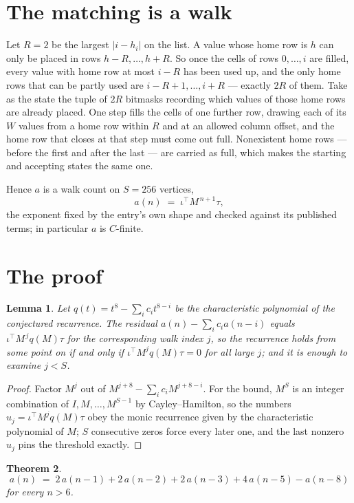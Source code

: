 \documentclass[11pt,a4paper]{article}
\theoremstyle{plain}
\newtheorem{theorem}{Theorem}
\newtheorem{lemma}[theorem]{Lemma}
\theoremstyle{definition}
\begin{document}
\section{The matching is a walk}

Let $R=2$ be the largest $|i-h_i|$ on the list. A value whose home row is $h$ can only be
placed in rows $h-R,\dots,h+R$. So once the cells of rows $0,\dots,i$ are filled, every
value with home row at most $i-R$ has been used up, and the only home rows that can be
partly used are $i-R+1,\dots,i+R$ --- exactly $2R$ of them. Take as the state the tuple of
$2R$ bitmasks recording which values of those home rows are already placed. One step fills
the cells of one further row, drawing each of its $W$ values from a home row within $R$
and at an allowed column offset, and the home row that closes at that step must come out
full. Nonexistent home rows --- before the first and after the last --- are carried as
full, which makes the starting and accepting states the same one.

Hence $a$ is a walk count on $S=256$ vertices,
\[
a(n)\;=\;\iota^{\!\top}M^{\,n+1}\tau ,
\]
the exponent fixed by the entry's own shape and checked against its published terms; in
particular $a$ is $C$-finite.

\section{The proof}

\begin{lemma}\label{lem:crit}
Let $q(t)=t^{8}-\sum_i c_it^{8-i}$ be the characteristic polynomial of the
conjectured recurrence. The residual $a(n)-\sum_ic_ia(n-i)$ equals
$\iota^{\!\top}M^{\,j}q(M)\tau$ for the corresponding walk index $j$, so the recurrence
holds from some point on if and only if $\iota^{\!\top}M^{j}q(M)\tau=0$ for all large $j$;
and it is enough to examine $j<S$.
\end{lemma}

\begin{proof}
Factor $M^{j}$ out of $M^{j+8}-\sum_ic_iM^{j+8-i}$. For the bound, $M^{S}$
is an integer combination of $I,M,\dots,M^{S-1}$ by Cayley--Hamilton, so the numbers
$u_j=\iota^{\!\top}M^{j}q(M)\tau$ obey the monic recurrence given by the characteristic
polynomial of $M$; $S$ consecutive zeros force every later one, and the last nonzero $u_j$
pins the threshold exactly.
\end{proof}

\begin{theorem}
\[
a(n)\;=\;2\,a(n-1) + 2\,a(n-2) + 2\,a(n-3) + 4\,a(n-5) - a(n-8)
\]
for every $n>6$.
\end{theorem}
\end{document}
